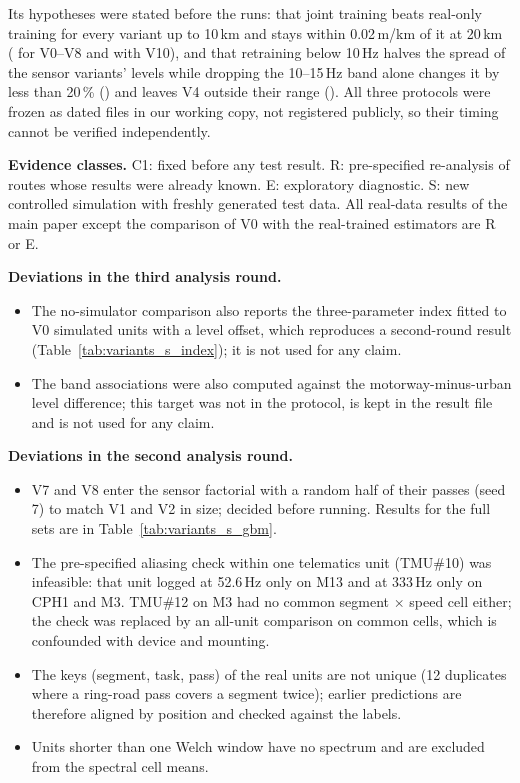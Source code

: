 \documentclass[onecolumn,10pt]{IEEEtran}
\begin{document}
Its hypotheses were stated before the runs: that joint training beats real-only training for every variant up to 10\,km and stays within 0.02\,m/km of it at 20\,km (\poHoneMeas{} for V0--V8 and \poHoneAll{} with V10), and that retraining below 10\,Hz halves the spread of the sensor variants' levels while dropping the 10--15\,Hz band alone changes it by less than 20\,\% (\blHthreeHolds) and leaves V4 outside their range (\blHthreeBHolds).
All three protocols were frozen as dated files in our working copy, not registered publicly, so their timing cannot be verified independently.

\textbf{Evidence classes.}
C1: fixed before any test result. R: pre-specified re-analysis of routes whose results were already known. E: exploratory diagnostic. S: new controlled simulation with freshly generated test data.
All real-data results of the main paper except the comparison of V0 with the real-trained estimators are R or E.

\textbf{Deviations in the third analysis round.}
\begin{itemize}
\item The no-simulator comparison also reports the three-parameter index fitted to V0 simulated units with a level offset, which reproduces a second-round result (Table~\ref{tab:variants_s_index}); it is not used for any claim.
\item The band associations were also computed against the motorway-minus-urban level difference; this target was not in the protocol, is kept in the result file and is not used for any claim.
\end{itemize}

\textbf{Deviations in the second analysis round.}
\begin{itemize}
\item V7 and V8 enter the sensor factorial with a random half of their passes (seed 7) to match V1 and V2 in size; decided before running. Results for the full sets are in Table~\ref{tab:variants_s_gbm}.
\item The pre-specified aliasing check within one telematics unit (TMU\#10) was infeasible: that unit logged at 52.6\,Hz only on M13 and at 333\,Hz only on CPH1 and M3. TMU\#12 on M3 had no common segment $\times$ speed cell either; the check was replaced by an all-unit comparison on common cells, which is confounded with device and mounting.
\item The keys (segment, task, pass) of the real units are not unique (12 duplicates where a ring-road pass covers a segment twice); earlier predictions are therefore aligned by position and checked against the labels.
\item Units shorter than one Welch window have no spectrum and are excluded from the spectral cell means.
\end{itemize}
\end{document}
